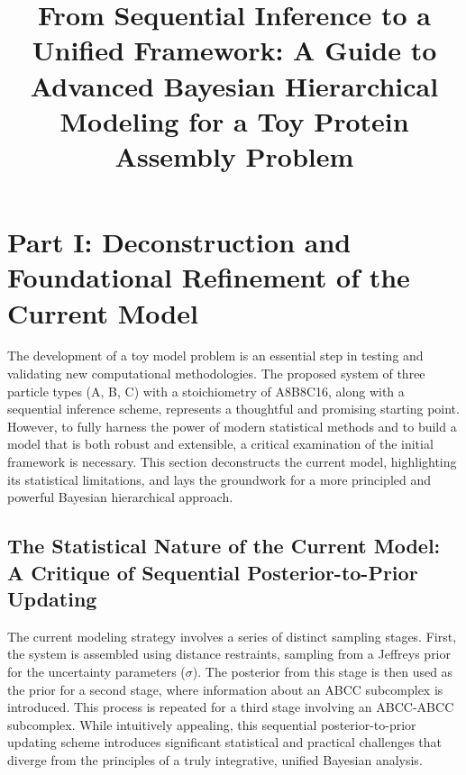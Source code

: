 \documentclass{article}
\begin{document}
\title{From Sequential Inference to a Unified Framework: A Guide to Advanced Bayesian Hierarchical Modeling for a Toy Protein Assembly Problem}
\date{}
\maketitle

\section{Part I: Deconstruction and Foundational Refinement of the Current Model}

The development of a toy model problem is an essential step in testing and validating new computational methodologies.\cite{ref1} The proposed system of three particle types (A, B, C) with a stoichiometry of A8B8C16, along with a sequential inference scheme, represents a thoughtful and promising starting point. However, to fully harness the power of modern statistical methods and to build a model that is both robust and extensible, a critical examination of the initial framework is necessary. This section deconstructs the current model, highlighting its statistical limitations, and lays the groundwork for a more principled and powerful Bayesian hierarchical approach.

\subsection{The Statistical Nature of the Current Model: A Critique of Sequential Posterior-to-Prior Updating}

The current modeling strategy involves a series of distinct sampling stages. First, the system is assembled using distance restraints, sampling from a Jeffreys prior for the uncertainty parameters ($\sigma$). The posterior from this stage is then used as the prior for a second stage, where information about an ABCC subcomplex is introduced. This process is repeated for a third stage involving an ABCC-ABCC subcomplex. While intuitively appealing, this sequential posterior-to-prior updating scheme introduces significant statistical and practical challenges that diverge from the principles of a truly integrative, unified Bayesian analysis.
\end{document}
